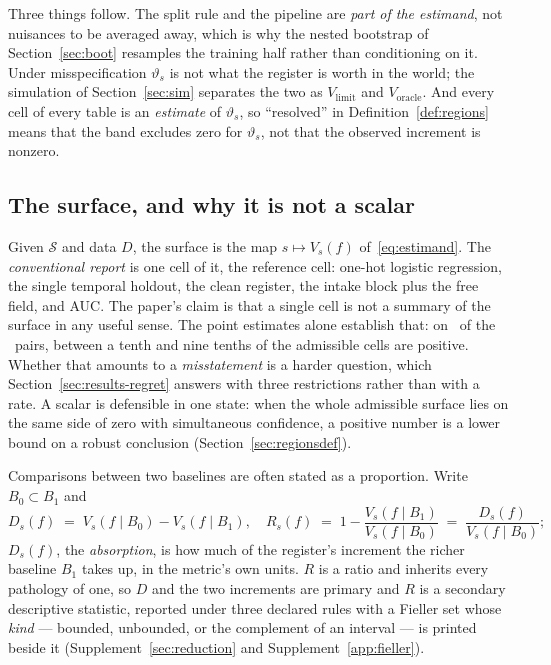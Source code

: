 \documentclass[11pt,3p,review,authoryear]{elsarticle}
\theoremstyle{definition}
\begin{document}
\noindent Three things follow. The split rule and the pipeline are
\emph{part of the estimand}, not nuisances to be averaged away, which is why
the nested bootstrap of Section~\ref{sec:boot} resamples the training half
rather than conditioning on it. Under misspecification $\vartheta_s$ is not
what the register is worth in the world; the simulation of
Section~\ref{sec:sim} separates the two as $V_{\mathrm{limit}}$ and
$V_{\mathrm{oracle}}$. And every cell of every table is an \emph{estimate} of
$\vartheta_s$, so ``resolved'' in Definition~\ref{def:regions} means that the
band excludes zero for $\vartheta_s$, not that the observed increment is
nonzero.

\subsection{The surface, and why it is not a scalar}

Given $\mathcal{S}$ and data $D$, the surface is the map $s \mapsto V_s(f)$
of~\eqref{eq:estimand}. The \emph{conventional report} is one cell of it, the
reference cell: one-hot logistic regression, the single temporal holdout, the
clean register, the intake block plus the free field, and AUC. The paper's
claim is that a single cell is not a summary of the surface in any useful
sense. The point estimates alone establish that: on \nSignVaries\ of the
\nPairs\ pairs, between a tenth and nine tenths of the admissible cells are
positive. Whether that amounts to a \emph{misstatement} is a harder question,
which Section~\ref{sec:results-regret} answers with three restrictions rather
than with a rate. A scalar is defensible in one state: when the whole
admissible surface lies on the same side of zero with simultaneous
confidence, a positive number is a lower bound on a robust conclusion
(Section~\ref{sec:regionsdef}).

Comparisons between two baselines are often stated as a proportion. Write
$B_0 \subset B_1$ and
\begin{equation}
D_s(f) \;=\; V_s(f \mid B_0) - V_s(f \mid B_1),
\quad
R_s(f) \;=\; 1 - \frac{V_s(f \mid B_1)}{V_s(f \mid B_0)}
\;=\; \frac{D_s(f)}{V_s(f \mid B_0)} ;
\label{eq:reduction}
\end{equation}
$D_s(f)$, the \emph{absorption}, is how much of the register's increment the
richer baseline $B_1$ takes up, in the metric's own units. $R$ is a ratio and
inherits every pathology of one, so $D$ and the two increments are primary
and $R$ is a secondary descriptive statistic, reported under three declared
rules with a Fieller set \citep{fieller1954} whose \emph{kind} --- bounded,
unbounded, or the complement of an interval --- is printed beside it
(Supplement~\ref{sec:reduction} and Supplement~\ref{app:fieller}).
\end{document}
